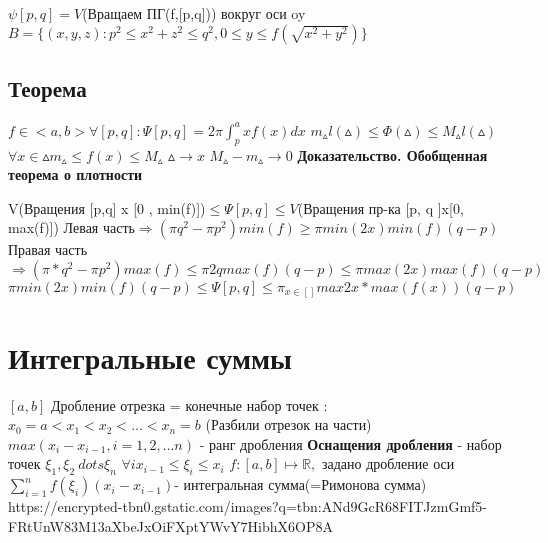 \documentclass[12pt, a4paper]{article}
\newcommand{\nl}{\newline}
\begin{document}
  $  \psi [p,q] = V$(Вращаем ПГ(f,[p,q])) вокруг оси  oy \nl
  $ B = \{(x, y, z) : p^2 \leq x^2 + z^2 \leq q^2, 0\leq y \leq f(\sqrt{x^2 + y^2})\} $ \nl
  \subsection{Теорема}
	$ f \in <a , b> \forall [p,q] : \Psi [p, q] = 2\pi \int_p^a x f(x)dx $ \nl
	$ m_\vartriangle l(\vartriangle) \leq \Phi(\vartriangle) \leq M_\vartriangle l(\vartriangle)   $ \nl
	$ \forall x \in \vartriangle  m_\vartriangle \leq f(x) \leq M_\vartriangle $ \nl
	$  \vartriangle \rightarrow x$    $M_\vartriangle - m_\vartriangle \rightarrow 0 $ \nl
	\textbf{Доказательство. Обобщенная теорема о плотности} \nl

	V(Вращения [p,q] x [0 , min(f)])$  \leq \Psi[p, q] \leq V$(Вращения пр-ка [p, q ]x[0, max(f)]) \nl
	Левая часть$  \Longrightarrow (\pi q^2 - \pi p^2)min(f) \geq \pi min(2x)min(f) (q - p)$    \nl          
	Правая часть $ \Longrightarrow( \pi*q^2 - \pi p^2) max(f) \leq  \pi 2q max(f)(q - p) \leq \pi max(2x)max(f)(q - p) $ \nl
	$\pi min(2x)min(f)(q - p )\leq \Psi[p ,q ] \leq  \pi_{x\in[]}max2x * max(f(x))(q-p)$\nl

\section{Интегральные суммы}
$ [a, b] $ Дробление отрезка  = конечные набор точек : \nl
$ x_0 = a < x_1 < x_2 < \dots < x_n = b $ (Разбили отрезок на части)\nl
$ max(x_i - x_{i - 1}, i = 1,2, \dots n)$ - ранг дробления \nl
\textbf{Оснащения дробления } - набор точек $ \xi_1, \xi_2 \ dots \xi_n $ \nl
$ \forall i x_{i - 1 } \leq \xi_i \leq x_i$ \nl
$ f: [a,b] \mapsto \mathbb{R}, $ задано дробление оси \nl
$ \sum_{i=1}^n f(\xi_i)(x_i -x_{i -1})$- интегральная сумма(=Римонова сумма) \nl
https://encrypted-tbn0.gstatic.com/images?q=tbn:ANd9GcR68FITJzmGmf5-FRtUnW83M13aXbeJxOiFXptYWvY7HibhX6OP8A \nl
\end{document}
